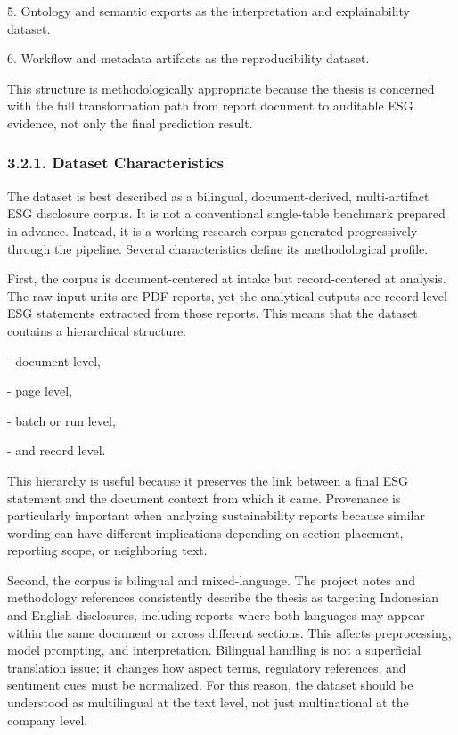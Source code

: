 \documentclass{article}
\begin{document}
5. Ontology and semantic exports as the interpretation and explainability dataset.

6. Workflow and metadata artifacts as the reproducibility dataset.

This structure is methodologically appropriate because the thesis is concerned with the full transformation path from report document to auditable ESG evidence, not only the final prediction result.
\subsubsection*{ 3.2.1. Dataset Characteristics}

The dataset is best described as a bilingual, document-derived, multi-artifact ESG disclosure corpus. It is not a conventional single-table benchmark prepared in advance. Instead, it is a working research corpus generated progressively through the pipeline. Several characteristics define its methodological profile.

First, the corpus is document-centered at intake but record-centered at analysis. The raw input units are PDF reports, yet the analytical outputs are record-level ESG statements extracted from those reports. This means that the dataset contains a hierarchical structure:

- document level,

- page level,

- batch or run level,

- and record level.

This hierarchy is useful because it preserves the link between a final ESG statement and the document context from which it came. Provenance is particularly important when analyzing sustainability reports because similar wording can have different implications depending on section placement, reporting scope, or neighboring text.

Second, the corpus is bilingual and mixed-language. The project notes and methodology references consistently describe the thesis as targeting Indonesian and English disclosures, including reports where both languages may appear within the same document or across different sections. This affects preprocessing, model prompting, and interpretation. Bilingual handling is not a superficial translation issue; it changes how aspect terms, regulatory references, and sentiment cues must be normalized. For this reason, the dataset should be understood as multilingual at the text level, not just multinational at the company level.
\end{document}
